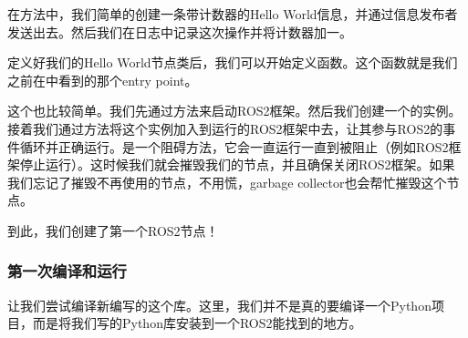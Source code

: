 \documentclass[letterpaper,10pt,english]{sphinxmanual}
\begin{document}
\sphinxAtStartPar
在方法中，我们简单的创建一条带计数器的Hello
World信息，并通过信息发布者发送出去。然后我们在日志中记录这次操作并将计数器加一。

\sphinxAtStartPar
定义好我们的Hello
World节点类后，我们可以开始定义函数。这个函数就是我们之前在中看到的那个entry
point。

\begin{sphinxVerbatim}[commandchars=\\\{\}]
 
      


   
\end{sphinxVerbatim}

\sphinxAtStartPar
这个也比较简单。我们先通过方法来启动ROS2框架。然后我们创建一个的实例。接着我们通过方法将这个实例加入到运行的ROS2框架中去，让其参与ROS2的事件循环并正确运行。是一个阻碍方法，它会一直运行一直到被阻止（例如ROS2框架停止运行）。这时候我们就会摧毁我们的节点，并且确保关闭ROS2框架。如果我们忘记了摧毁不再使用的节点，不用慌，garbage
collector也会帮忙摧毁这个节点。

\sphinxAtStartPar
到此，我们创建了第一个ROS2节点！


\subsubsection{第一次编译和运行}
\label{\detokenize{chapter_rl_sys/ros_code_ex:id6}}
\sphinxAtStartPar
让我们尝试编译新编写的这个库。这里，我们并不是真的要编译一个Python项目，而是将我们写的Python库安装到一个ROS2能找到的地方。
\end{document}
